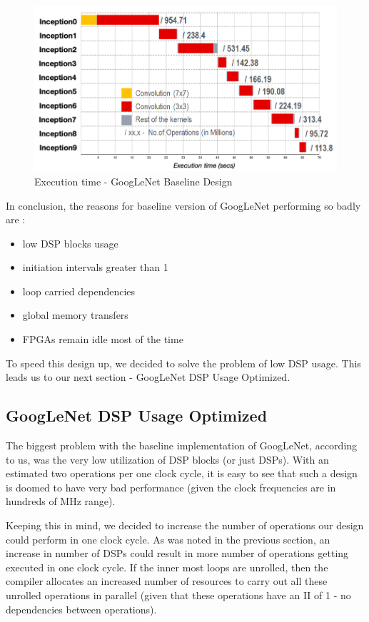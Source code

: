 \begin{figure}[!htb]
  \includegraphics[width=\textwidth,height=\textheight,keepaspectratio]{img/GoogLeNetBaseline_Runtime_Graph.png}
  \caption{Execution time - GoogLeNet Baseline Design}
  \label{fig:GoogLeNetBaseline_Runtime_Graph}
\end{figure}

In conclusion, the reasons for baseline version of GoogLeNet performing so badly are :
\begin{itemize}
    \item low DSP blocks usage
    \item initiation intervals greater than 1
    \item loop carried dependencies 
    \item global memory transfers
    \item FPGAs remain idle most of the time
\end{itemize}

To speed this design up, we decided to solve the problem of low DSP usage. This leads us to our next section - GoogLeNet DSP Usage Optimized.

\subsection{GoogLeNet DSP Usage Optimized}
The biggest problem with the baseline implementation of GoogLeNet, according to us, was the very low utilization of DSP blocks (or just DSPs). With an estimated two operations per one clock cycle, it is easy to see that such a design is doomed to have very bad performance (given the clock frequencies are in hundreds of MHz range).
 
Keeping this in mind, we decided to increase the number of operations our design could perform in one clock cycle. As was noted in the previous section, an increase in number of DSPs could result in more number of operations getting executed in one clock cycle. If the inner most loops are unrolled, then the compiler allocates an increased number of resources to carry out all these unrolled operations in parallel (given that these operations have an II of 1 - no dependencies between operations). 
 
